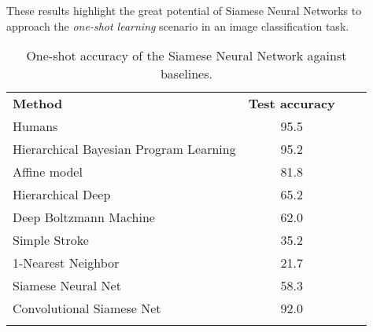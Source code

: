 These results highlight the great potential of Siamese Neural Networks to approach the \emph{one-shot learning} scenario in an image classification task.

\begin{table}[htb!]
\centering    
\caption{One-shot accuracy of the Siamese Neural Network against baselines.}
\label{tab:one-shot_perf}
\begin{tabular}{lccp{10cm}}
\hline\noalign{\smallskip}
\textbf{Method} & \textbf{Test accuracy}\\
\noalign{\smallskip}\hline\noalign{\smallskip}
\parbox{8cm}{Humans} & 95.5}\\
\parbox{8cm}{Hierarchical Bayesian Program Learning} & 95.2}\\
\parbox{8cm}{Affine model} & 81.8}\\
\parbox{8cm}{Hierarchical Deep} & 65.2}\\
\parbox{8cm}{Deep Boltzmann Machine} & 62.0}\\
\parbox{8cm}{Simple Stroke} & 35.2}\\
\parbox{8cm}{1-Nearest Neighbor} & 21.7}\\
\parbox{8cm}{Siamese Neural Net} & 58.3}\\
\parbox{8cm}{Convolutional Siamese Net} & 92.0}\\
\noalign{\smallskip}\hline\noalign{\smallskip}
\end{tabular}
\end{table}








